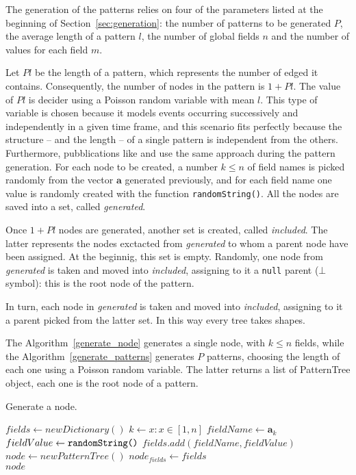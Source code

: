 \documentclass{acm_proc_article-sp-sigmod09}
\begin{document}
The generation of the patterns relies on four of the parameters listed at the beginning of Section~\ref{sec:generation}: the number of patterns to be generated $P$, the average length of a pattern $l$, the number of global fields $n$ and the number of values for each field $m$.

Let $Pl$ be the length of a pattern, which represents the number of edged it contains. Consequently, the number of nodes in the pattern is $1 + Pl$. The value of $Pl$ is decider using a Poisson random variable with mean $l$. This type of variable is chosen because it models events occurring successively and independently in a given time frame, and this scenario fits perfectly because the structure -- and the length -- of a single pattern is independent from the others. Furthermore, pubblications like \cite{agrawal1994fast} and \cite{ivancsy2006time} use the same approach during the pattern generation. For each node to be created, a number $k \le n$ of field names is picked randomly from the vector $\boldsymbol{a}$ generated previously, and for each field name one value is randomly created with the function \texttt{randomString()}. All the nodes are saved into a set, called \emph{generated}.

Once $1 + Pl$ nodes are generated, another set is created, called \emph{included}. The latter represents the nodes exctacted from \emph{generated} to whom a parent node have been assigned. At the beginnig, this set is empty. Randomly, one node from \emph{generated} is taken and moved into \emph{included}, assigning to it a \texttt{null} parent ($\bot$ symbol): this is the root node of the pattern. 

In turn, each node in \emph{generated} is taken and moved into \emph{included}, assigning to it a parent picked from the latter set. In this way every tree takes shapes.

The Algorithm~\ref{generate_node} generates a single node, with $k \le n$ fields, while the Algorithm~\ref{generate_patterns} generates $P$ patterns, choosing the length of each one using a Poisson random variable. The latter returns a list of PatternTree object, each one is the root node of a pattern.

\begin{algorithm}
\caption{Generate a node.}
\label{generate_node}
\begin{algorithmic}[1]
\State $fields \gets new Dictionary()$
	\State $k \gets x : x \in [1, n]$
	\State $fieldName \gets \boldsymbol{a}_k$
	\State $fieldValue \gets \text{\texttt{randomString()}}$
	\State $fields.add(fieldName, fieldValue)$
\EndFor
\State $node \gets new PatternTree()$
\State $node_{fields} \gets fields$ \\
\Return $node$
\EndFunction
\end{algorithmic}
\end{algorithm}
\end{document}
